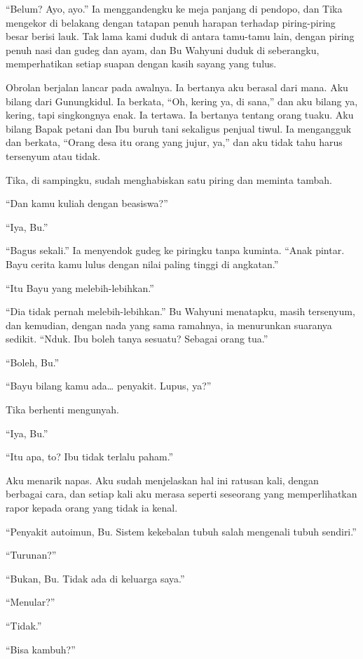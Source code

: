 \documentclass[11pt,twoside,openany]{book}
\begin{document}
``Belum? Ayo, ayo.'' Ia menggandengku ke meja panjang di pendopo, dan Tika mengekor di belakang dengan tatapan penuh harapan terhadap piring-piring besar berisi lauk. Tak lama kami duduk di antara tamu-tamu lain, dengan piring penuh nasi dan gudeg dan ayam, dan Bu Wahyuni duduk di seberangku, memperhatikan setiap suapan dengan kasih sayang yang tulus.

Obrolan berjalan lancar pada awalnya. Ia bertanya aku berasal dari mana. Aku bilang dari Gunungkidul. Ia berkata, ``Oh, kering ya, di sana,'' dan aku bilang ya, kering, tapi singkongnya enak. Ia tertawa. Ia bertanya tentang orang tuaku. Aku bilang Bapak petani dan Ibu buruh tani sekaligus penjual tiwul. Ia mengangguk dan berkata, ``Orang desa itu orang yang jujur, ya,'' dan aku tidak tahu harus tersenyum atau tidak.

Tika, di sampingku, sudah menghabiskan satu piring dan meminta tambah.

``Dan kamu kuliah dengan beasiswa?''

``Iya, Bu.''

``Bagus sekali.'' Ia menyendok gudeg ke piringku tanpa kuminta. ``Anak pintar. Bayu cerita kamu lulus dengan nilai paling tinggi di angkatan.''

``Itu Bayu yang melebih-lebihkan.''

``Dia tidak pernah melebih-lebihkan.'' Bu Wahyuni menatapku, masih tersenyum, dan kemudian, dengan nada yang sama ramahnya, ia menurunkan suaranya sedikit. ``Nduk. Ibu boleh tanya sesuatu? Sebagai orang tua.''

``Boleh, Bu.''

``Bayu bilang kamu ada\ldots{} penyakit. Lupus, ya?''

Tika berhenti mengunyah.

``Iya, Bu.''

``Itu apa, to? Ibu tidak terlalu paham.''

Aku menarik napas. Aku sudah menjelaskan hal ini ratusan kali, dengan berbagai cara, dan setiap kali aku merasa seperti seseorang yang memperlihatkan rapor kepada orang yang tidak ia kenal.

``Penyakit autoimun, Bu. Sistem kekebalan tubuh salah mengenali tubuh sendiri.''

``Turunan?''

``Bukan, Bu. Tidak ada di keluarga saya.''

``Menular?''

``Tidak.''

``Bisa kambuh?''
\end{document}
